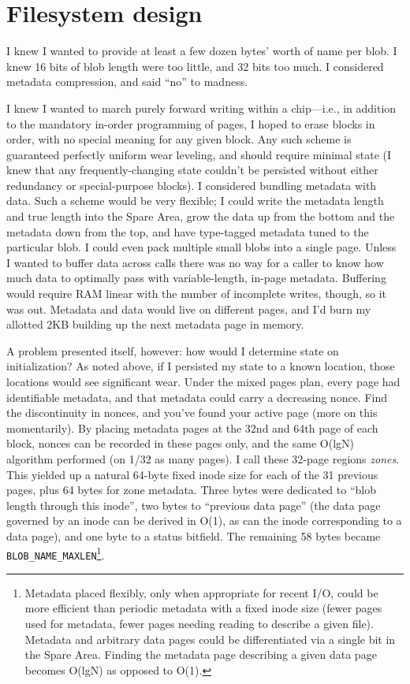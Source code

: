 \documentclass[letterpaper,10pt]{article}
\begin{document}
\section{Filesystem design}
I knew I wanted to provide at least a few dozen bytes' worth of name per blob.
I knew 16 bits of blob length were too little, and 32 bits too much.
I considered metadata compression, and said ``no'' to madness.

I knew I wanted to march purely forward writing within a chip---i.e., in
addition to the mandatory in-order programming of pages, I hoped to erase
blocks in order, with no special meaning for any given block. Any such scheme
is guaranteed perfectly uniform wear leveling, and should require minimal state
(I knew that any frequently-changing state couldn't be persisted without either
redundancy or special-purpose blocks). I considered bundling metadata with
data. Such a scheme would be very flexible; I could write the metadata length
and true length into the Spare Area, grow the data up from the bottom and the
metadata down from the top, and have type-tagged metadata tuned to the particular
blob. I could even pack multiple small blobs into a single page. Unless I
wanted to buffer data across calls there was no way for a caller to know how
much data to optimally pass with variable-length, in-page metadata. Buffering
would require RAM linear with the number of incomplete writes, though, so it
was out. Metadata and data would live on different pages, and I'd burn my
allotted 2KB building up the next metadata page in memory.

A problem presented itself, however: how would I determine state on
initialization? As noted above, if I persisted my state
to a known location, those locations would see significant wear. Under the
mixed pages plan, every page had identifiable metadata, and that metadata could
carry a decreasing nonce. Find the discontinuity in nonces, and you've found
your active page (more on this momentarily). By placing metadata pages at the
32nd and 64th page of each block, nonces can be recorded in these pages only, and
the same O(lgN) algorithm performed (on 1/32 as many pages). I call these
32-page regions \textit{zones}. This yielded up a natural 64-byte fixed inode
size for each of the 31 previous pages, plus 64 bytes for zone metadata. Three
bytes were dedicated to ``blob length through this inode'', two bytes to
``previous data page'' (the data page governed by an inode can be derived in
O(1), as can the inode corresponding to a data
page), and one byte to a status bitfield. The remaining 58 bytes became
\texttt{BLOB\_NAME\_MAXLEN}\footnote{Metadata placed flexibly, only when
  appropriate for recent I/O, could be more efficient than periodic metadata
  with a fixed inode size (fewer pages used for metadata, fewer pages needing
  reading to describe a given file). Metadata and arbitrary data pages could be
  differentiated via a single bit in the Spare Area. Finding the metadata page
  describing a given data page becomes O(lgN) as opposed to O(1).}.
\end{document}
